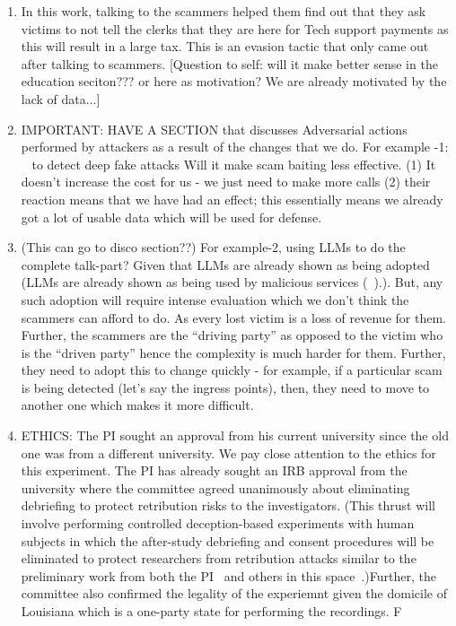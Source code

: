 \begin{enumerate}
\item In this work, talking to the scammers helped them find out that they ask victims to not tell the clerks that they are here for Tech support payments as this will result in a large tax. This is an evasion tactic that only came out after talking to scammers. \cite{ayumu2024threat}   [Question to self: will it make better sense in the education seciton??? or here as motivation? We are already motivated by the lack of data...]
\item IMPORTANT: HAVE A SECTION that discusses Adversarial actions performed by attackers as a result of the changes that we do.  For example -1: ~\cite{KumariAPRAJS25} to detect deep fake attacks Will it make scam baiting less effective. (1) It doesn't increase the cost for us - we just need to make more calls (2) their reaction means that we have had an effect; this essentially means we already got a lot of usable data which will be used for defense.
\item (This can go to disco section??) For example-2, using LLMs to do the complete talk-part? Given that LLMs are already shown as being adopted (\eg LLMs are already shown as being used by malicious services (\eg ~\cite{LinCL024}).). But, any such adoption will require intense evaluation which we don't think the scammers can afford to do. As every lost victim is a loss of revenue for them. Further, the scammers are the ``driving party'' as opposed to the victim who is the ``driven party'' hence the complexity is much harder for them. Further, they need to adopt this to change quickly - for example, if a particular scam is being detected (let's say the ingress points), then, they need to move to another one which makes it more difficult. 

\item  ETHICS: The PI sought an approval from his current university since the old one was from a different university. We pay close attention to the ethics for this experiment. The PI has already sought an IRB approval from the university where the committee agreed unanimously about eliminating debriefing to protect retribution risks to the investigators. (This thrust will involve performing controlled deception-based experiments with human subjects in which the after-study debriefing and consent procedures will be eliminated to protect researchers from retribution attacks similar to the preliminary work from both the PI~\cite{honeytweets} and others in this space~\cite{MiramirkhaniSN16}.)Further, the committee also confirmed the legality of the experiemnt given the domicile of Louisiana which is a one-party state for performing the recordings. F 

\end{enumerate}


